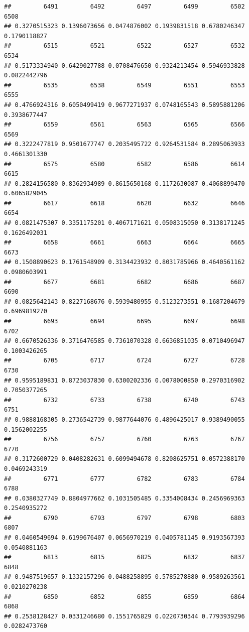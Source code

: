 \documentclass[
]{article}
\begin{document}
\begin{verbatim}
##         6491         6492         6497         6499         6502         6508 
## 0.3270515323 0.1396073656 0.0474876002 0.1939831518 0.6780246347 0.1790118827 
##         6515         6521         6522         6527         6532         6534 
## 0.5173334940 0.6429027788 0.0708476650 0.9324213454 0.5946933828 0.0822442796 
##         6535         6538         6549         6551         6553         6555 
## 0.4766924316 0.6050499419 0.9677271937 0.0748165543 0.5895881206 0.3938677447 
##         6559         6561         6563         6565         6566         6569 
## 0.3222477819 0.9501677747 0.2035495722 0.9264531584 0.2895063933 0.4661301330 
##         6575         6580         6582         6586         6614         6615 
## 0.2824156580 0.8362934989 0.8615650168 0.1172630087 0.4068899470 0.6065829045 
##         6617         6618         6620         6632         6646         6654 
## 0.0821475307 0.3351175201 0.4067171621 0.0508315050 0.3138171245 0.1626492031 
##         6658         6661         6663         6664         6665         6673 
## 0.1508890623 0.1761548909 0.3134423932 0.8031785966 0.4640561162 0.0980603991 
##         6677         6681         6682         6686         6687         6690 
## 0.0825642143 0.8227168676 0.5939480955 0.5123273551 0.1687204679 0.6969819270 
##         6693         6694         6695         6697         6698         6702 
## 0.6670526336 0.3716476585 0.7361070328 0.6636851035 0.0710496947 0.1003426265 
##         6705         6717         6724         6727         6728         6730 
## 0.9595189831 0.8723037830 0.6300202336 0.0078000850 0.2970316902 0.7050377265 
##         6732         6733         6738         6740         6743         6751 
## 0.9888168305 0.2736542739 0.9877644076 0.4896425017 0.9389490055 0.1562002255 
##         6756         6757         6760         6763         6767         6770 
## 0.3172600729 0.0408282631 0.6099494678 0.8208625751 0.0572388170 0.0469243319 
##         6771         6777         6782         6783         6784         6788 
## 0.0380327749 0.8804977662 0.1031505485 0.3354008434 0.2456969363 0.2540935272 
##         6790         6793         6797         6798         6803         6807 
## 0.0460549694 0.6199676407 0.0656970219 0.0405781145 0.9193567393 0.0540881163 
##         6813         6815         6825         6832         6837         6848 
## 0.9487519657 0.1332157296 0.0488258895 0.5785278880 0.9589263561 0.0210270238 
##         6850         6852         6855         6859         6864         6868 
## 0.2538128427 0.0331246680 0.1551765829 0.0220730344 0.7793939296 0.0282473760 

\end{verbatim}
\end{document}
